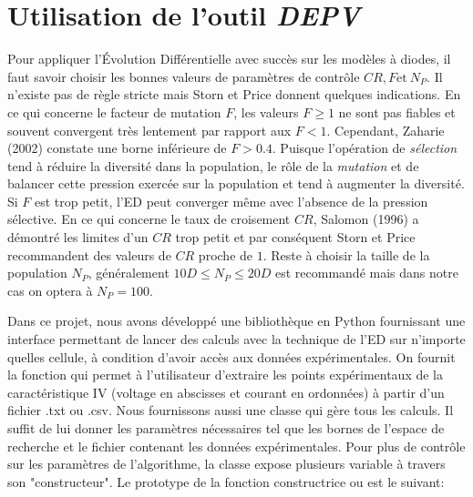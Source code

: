 \section{Utilisation de l'outil \textit{DEPV}}

Pour appliquer l'Évolution Différentielle avec succès sur les modèles à diodes, il faut savoir choisir les bonnes valeurs de paramètres de contrôle $CR, F \text{et}\  N_P$. Il n'existe pas de règle stricte mais Storn et Price \cite{Price2005} donnent quelques indications. En ce qui concerne le facteur de mutation $F$, les valeurs $F \geq 1$ ne sont pas fiables et souvent convergent très lentement par rapport aux $F < 1$. Cependant, Zaharie (2002) \cite{Zaharie2002} constate une borne inférieure de $F > 0.4$. Puisque l'opération de \textit{sélection} tend à réduire la diversité dans la population, le rôle de la \textit{mutation} et de balancer cette pression exercée sur la population et tend à augmenter la diversité. Si $F$ est trop petit, l'ED peut converger même avec l'absence de la pression sélective. En ce qui concerne le taux de croisement $CR$, Salomon (1996) \cite{Salomon1996} a démontré les limites d'un $CR$ trop petit et par conséquent Storn et Price recommandent des valeurs de $CR$ proche de $1$. Reste à choisir la taille de la population $N_P$, généralement $10D \leq N_P \leq 20D$ est recommandé mais dans notre cas on optera à $N_P = 100$.

Dans ce projet, nous avons développé une bibliothèque en Python fournissant une interface permettant de lancer des calculs avec la technique de l'ED sur n'importe quelles cellule, à condition d'avoir accès aux données expérimentales. On fournit la fonction  qui permet à l'utilisateur d'extraire les points expérimentaux de la caractéristique IV (voltage en abscisses et courant en ordonnées) à partir d'un fichier .txt ou .csv. Nous fournissons aussi une classe  qui gère tous les calculs. Il suffit de lui donner les paramètres nécessaires tel que les bornes de l'espace de recherche et le fichier contenant les données expérimentales. Pour plus de contrôle sur les paramètres de l'algorithme, la classe  expose plusieurs variable à travers son "constructeur". Le prototype de la fonction constructrice ou  est le suivant:

